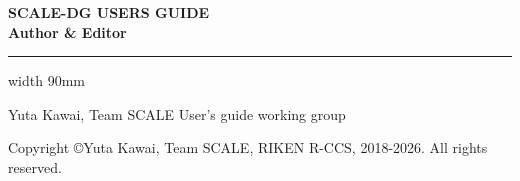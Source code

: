 \newpage
\thispagestyle{empty}

\vspace{10mm}
{\large{\bf SCALE-DG USERS GUIDE}}\\


\vspace{10mm}
{\large{\bf Author \& Editor}}\\
\hrule width 90mm
\begin{tabbing}
Yuta Kawai, Team SCALE User's guide working group\\
\end{tabbing}


\vspace{110mm}
\begin{flushright}
\noindent {\small {\rm
\ovalbox{
}}}

\vspace{10mm}
Copyright \copyright Yuta Kawai, Team SCALE, RIKEN R-CCS, 2018-2026. All rights reserved.
\end{flushright}

